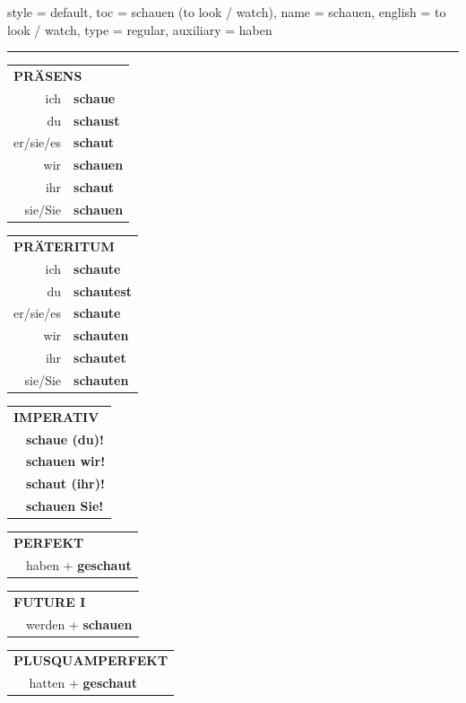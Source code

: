 \begin{verbentry}{
  style = {default},
  toc = {schauen (to look / watch)},
  name = {schauen},
  english = {to look / watch},
  type = {regular},
  auxiliary = {haben}
}
 

\vspace{5pt}
\hrule
\vspace{5pt}

\begin{tabular}{rl}
\multicolumn{2}{l}{\textbf{PRÄSENS}}\\
ich & \textbf{schaue}\\
du & \textbf{schaust}\\
er/sie/es & \textbf{schaut}\\
wir & \textbf{schauen}\\
ihr & \textbf{schaut}\\
sie/Sie & \textbf{schauen}\\
\end{tabular}
\hfill
\begin{tabular}{rl}
\multicolumn{2}{l}{\textbf{PRÄTERITUM}}\\
ich & \textbf{schaute}\\
du & \textbf{schautest}\\
er/sie/es & \textbf{schaute}\\
wir & \textbf{schauten}\\
ihr & \textbf{schautet}\\
sie/Sie & \textbf{schauten}\\
\end{tabular}
\hfill
\begin{tabular}{rl}
\multicolumn{2}{l}{\textbf{IMPERATIV}}\\
& \textbf{schaue (du)!}\\
& \textbf{schauen wir!}\\
& \textbf{schaut (ihr)!}\\
& \textbf{schauen Sie!}\\
\end{tabular}

\vspace{10pt}

\begin{tabular}{rl}
\multicolumn{2}{l}{\textbf{PERFEKT}}\\
& haben + \textbf{geschaut}\\
\end{tabular}
\hfill
\begin{tabular}{rl}
\multicolumn{2}{l}{\textbf{FUTURE I}}\\
& werden + \textbf{schauen}\\
\end{tabular}
\hfill
\begin{tabular}{rl}
\multicolumn{2}{l}{\textbf{PLUSQUAMPERFEKT}}\\
& hatten + \textbf{geschaut}\\
\end{tabular}


\end{verbentry}
